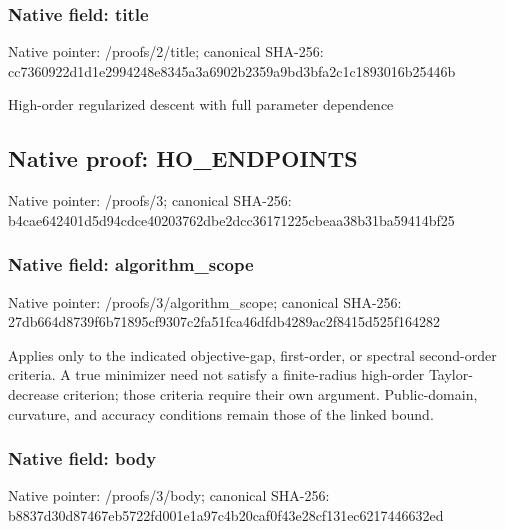 \documentclass[10pt,a4paper]{article}
\begin{document}
\subsubsection{Native field: title}
Native pointer: /proofs/2/title; canonical SHA-256: cc7360922d1d1e2994248e8345a3a6902b2359a9bd3bfa2c1c1893016b25446b

\begingroup\raggedright\sloppy High-order regularized descent with full parameter dependence\par\endgroup

\subsection{Native proof: HO\_\allowbreak{}ENDPOINTS}
Native pointer: /proofs/3; canonical SHA-256: b4cae642401d5d94cdce40203762dbe2dcc36171225cbeaa38b31ba59414bf25

\subsubsection{Native field: algorithm\_\allowbreak{}scope}
Native pointer: /proofs/3/algorithm\_\allowbreak{}scope; canonical SHA-256: 27db664d8739f6b71895cf9307c2fa51fca46dfdb4289ac2f8415d525f164282

\begingroup\raggedright\sloppy Applies only to the indicated objective-gap,\allowbreak{} first-order,\allowbreak{} or spectral second-order criteria. A true minimizer need not satisfy a finite-radius high-order Taylor-decrease criterion;\allowbreak{} those criteria require their own argument. Public-domain,\allowbreak{} curvature,\allowbreak{} and accuracy conditions remain those of the linked bound.\par\endgroup

\subsubsection{Native field: body}
Native pointer: /proofs/3/body; canonical SHA-256: b8837d30d87467eb5722fd001e1a97c4b20caf0f43e28cf131ec6217446632ed
\end{document}
